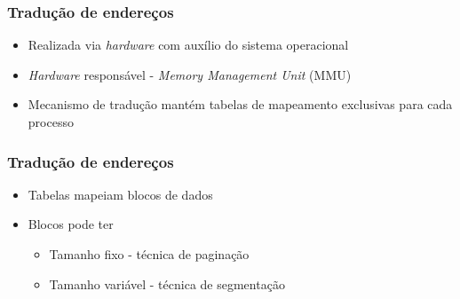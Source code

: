 \documentclass[aspectratio=169,
				xcolor=table]{beamer}
\begin{document}
	\begin{frame}
		\frametitle{Tradução de endereços}
		
		\begin{itemize}
			\item Realizada via \textit{hardware} com auxílio do sistema operacional
			\vspace{1em}
			\item \textit{Hardware} responsável - \textit{Memory Management Unit} (MMU)
			\vspace{1em}
			\item Mecanismo de tradução mantém tabelas de mapeamento exclusivas para cada processo
			
		\end{itemize}
	\end{frame}
	
	\begin{frame}
		\frametitle{Tradução de endereços}
		\begin{itemize}
			\item Tabelas mapeiam blocos de dados
			\item Blocos pode ter
			\begin{itemize}
				\item Tamanho fixo - técnica de paginação
				\item Tamanho variável - técnica de segmentação
			\end{itemize}
		\end{itemize}
	\end{frame}
	
\end{document}
